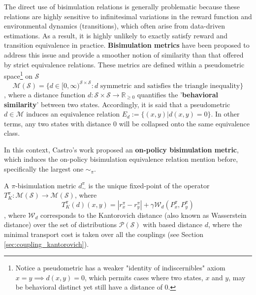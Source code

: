 The direct use of bisimulation relations is generally problematic because these relations are highly sensitive to infinitesimal variations in the reward function and environmental dynamics (transitions), which often arise from data-driven estimations. As a result, it is highly unlikely to exactly satisfy reward and transition equivalence in practice. \textbf{Bisimulation metrics} \cite{ferns2004metrics, ferns2011bisimulation, ferns2014bisimulation, castro2020scalable} have been proposed to address this issue and provide a smoother notion of similarity than that offered by strict equivalence relations. These metrics are defined within a pseudometric space\footnote{Notice a pseudometric has a weaker "identity of indiscernibles" axiom $x = y \implies d(x,y) = 0$, which permits cases where two states, $x$ and $y$, may be behavioral distinct yet still have a distance of 0. } on $\mathcal{S}$ 
\begin{equation}
\mathcal{M(S)}= \{d \in [0, \infty)^{\mathcal{S} \times \mathcal{S}} : d \text{ symmetric and satisfies the triangle inequality}\}
\end{equation}
, where a distance function \(d : \mathcal{S} \times \mathcal{S} \rightarrow \mathbb{R}_{\geq 0}\) quantifies the '\textbf{behavioral similarity}' between two states. Accordingly, it is said that a pseudometric $d \in \mathcal{M}$ induces an equivalence relation $E_d := \{(x, y)|d(x, y) = 0\}$. In other terms, any two states with distance 0 will be collapsed onto the same equivalence class.

In this context, Castro's work \cite{castro2020scalable} proposed an \textbf{on-policy bisimulation metric}, which induces the on-policy bisimulation equivalence relation mention before, specifically the largest one $\sim_\pi$.

\begin{definition}
\label{def:on_policy_bisimulation_metric}
A $\pi$-bisimulation metric $d^\pi_\sim$ is the unique fixed-point of the operator $T^\pi_K : \mathcal{M(S)} \rightarrow \mathcal{M(S)}$, where 
\begin{equation}
    \label{eq:on_policy_bisim_metric}
    T^\pi_K(d)(x, y) = |r^\pi_x - r^\pi_y| + \gamma \mathcal{W}_d(P^\pi_x,P^\pi_y) 
\end{equation}
, where $\mathcal{W}_d$ corresponds to the Kantorovich distance (also known as Wasserstein distance) over the set of distributions $\mathcal{P}(\mathcal{S})$ with based distance $d$, where the minimal transport cost is taken over all the couplings (see Section \ref{sec:coupling_kantorovich}).
\end{definition}

